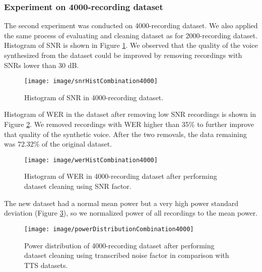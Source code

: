 \documentclass[12pt]{article}
\begin{document}
\subsubsection{Experiment on 4000-recording dataset}
The second experiment was conducted on 4000-recording dataset. We also applied the same process of evaluating and cleaning dataset as for 2000-recording dataset. Histogram of SNR is shown in Figure \ref{fig_snrHistCombination4000}. We observed that the quality of the voice synthesized from the dataset could be improved by removing recordings with SNRs lower than 30 dB.
\begin{figure}[t]
\begin{center}
\texttt{[image: image/snrHistCombination4000]}
\end{center}
\vspace{-0.3cm}
\caption[Histogram of SNR in 4000-recording dataset.]{Histogram of SNR in 4000-recording dataset.}
\label{fig_snrHistCombination4000}
\end{figure}
Histogram of WER in the dataset after removing low SNR recordings is shown in Figure \ref{fig_werHistCombination4000}. We removed recordings with WER higher than 35\% to further improve that quality of the synthetic voice. After the two removals, the data remaining was 72.32\% of the original dataset.
\begin{figure}[t]
\begin{center}
\texttt{[image: image/werHistCombination4000]}
\end{center}
\vspace{-0.3cm}
\caption[Histogram of WER in 4000-recording dataset after performing dataset cleaning using SNR factor.]{Histogram of WER in 4000-recording dataset after performing dataset cleaning using SNR factor.}
\label{fig_werHistCombination4000}
\end{figure}
The new dataset had a normal mean power but a very high power standard deviation (Figure \ref{fig_powerDistributionCombination4000}), so we normalized power of all recordings to the mean power.
\begin{figure}[t]
\begin{center}
\texttt{[image: image/powerDistributionCombination4000]}
\end{center}
\vspace{-0.3cm}
\caption[Power distribution of 4000-recording dataset after performing dataset cleaning using transcribed noise factor in comparison with TTS datasets.]{Power distribution of 4000-recording dataset after performing dataset cleaning using transcribed noise factor in comparison with TTS datasets.}
\label{fig_powerDistributionCombination4000}
\end{figure}
\end{document}
